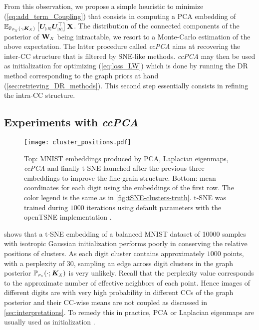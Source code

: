 From this observation, we propose a simple heuristic to minimize (\ref{eq:add_term_Coupling}) that consists in computing a PCA embedding of $\mathbb{E}_{\mathbb{P}_{\scaleto{\mathcal{P}_X}{4pt}}(\cdot;\bm{K}_{\scaleto{X}{3pt}})}\left[ \bm{U}_{\scaleto{[:R]}{5pt}}\bm{U}_{\scaleto{[R]}{5pt}}^\top \right]\X$. The distribution of the connected components of the posterior of $\W_{\scaleto{X}{4pt}}$ being intractable, we resort to a Monte-Carlo estimation of the above expectation. The latter procedure called \textit{ccPCA} aims at recovering the inter-CC structure that is filtered by SNE-like methods. \textit{ccPCA} may then be used as initialization for optimizing (\ref{eq:loss_LW}) which is done by running the DR method corresponding to the graph priors at hand (\cref{sec:retrieving_DR_methods}). This second step essentially consists in refining the intra-CC structure. 

\subsection{Experiments with \textit{ccPCA}}\label{sec:ccPCA}

\begin{figure*}[t]
\begin{center}
\centerline{\texttt{[image: cluster\_positions.pdf]}}
\caption{Top: MNIST embeddings produced by PCA, Laplacian eigenmaps, \textit{ccPCA} and finally t-SNE launched after the previous three embeddings to improve the fine-grain structure. Bottom: mean coordinates for each digit using the embeddings of the first row. The color legend is the same as in \cref{fig:tSNE-clusters-truth}. t-SNE was trained during $1000$ iterations using default parameters with the openTSNE implementation \cite{polivcar2019opentsne}.}
\label{fig:methods_embeddings}
\end{center}
\vspace{-0.8cm}
\end{figure*}

 shows that a t-SNE embedding of a balanced MNIST dataset of 10000 samples \cite{deng2012mnist} with isotropic Gaussian initialization performs poorly in conserving the relative positions of clusters. As each digit cluster contains approximately $1000$ points, with a perplexity of $30$, sampling an edge across digit clusters in the graph posterior $\mathbb{P}_{\scaleto{\mathcal{P}_X}{4pt}}(\cdot;\bm{K}_{\scaleto{X}{4pt}})$ is very unlikely. Recall that the perplexity value \cite{maaten2008tSNE} corresponds to the approximate number of effective neighbors of each point. Hence images of different digits are with very high probability in different CCs of the graph posterior and their CC-wise means are not coupled as discussed in \cref{sec:interpretations}. To remedy this in practice, PCA or Laplacian eigenmaps are usually used as initialization \cite{kobak2021initialization}. 

